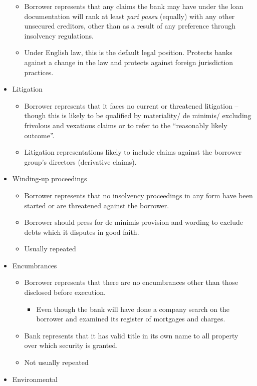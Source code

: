 \documentclass[
]{article}
\providecommand{\tightlist}{%
  \setlength{\itemsep}{0pt}\setlength{\parskip}{0pt}}
\begin{document}
\begin{itemize}
  \begin{itemize}
  \tightlist
  \item
    Borrower represents that any claims the bank may have under the loan
    documentation will rank at least \emph{pari passu} (equally) with
    any other unsecured creditors, other than as a result of any
    preference through insolvency regulations.
  \item
    Under English law, this is the default legal position. Protects
    banks against a change in the law and protects against foreign
    jurisdiction practices.
  \end{itemize}
\item
  Litigation

  \begin{itemize}
  \tightlist
  \item
    Borrower represents that it faces no current or threatened
    litigation -- though this is likely to be qualified by materiality/
    de minimis/ excluding frivolous and vexatious claims or to refer to
    the ``reasonably likely outcome''.
  \item
    Litigation representations likely to include claims against the
    borrower group's directors (derivative claims).
  \end{itemize}
\item
  Winding-up proceedings

  \begin{itemize}
  \tightlist
  \item
    Borrower represents that no insolvency proceedings in any form have
    been started or are threatened against the borrower.
  \item
    Borrower should press for de minimis provision and wording to
    exclude debts which it disputes in good faith.
  \item
    Usually repeated
  \end{itemize}
\item
  Encumbrances

  \begin{itemize}
  \tightlist
  \item
    Borrower represents that there are no encumbrances other than those
    disclosed before execution.

    \begin{itemize}
    \tightlist
    \item
      Even though the bank will have done a company search on the
      borrower and examined its register of mortgages and charges.
    \end{itemize}
  \item
    Bank represents that it has valid title in its own name to all
    property over which security is granted.
  \item
    Not usually repeated
  \end{itemize}
\item
  Environmental


\end{itemize}
\end{document}
